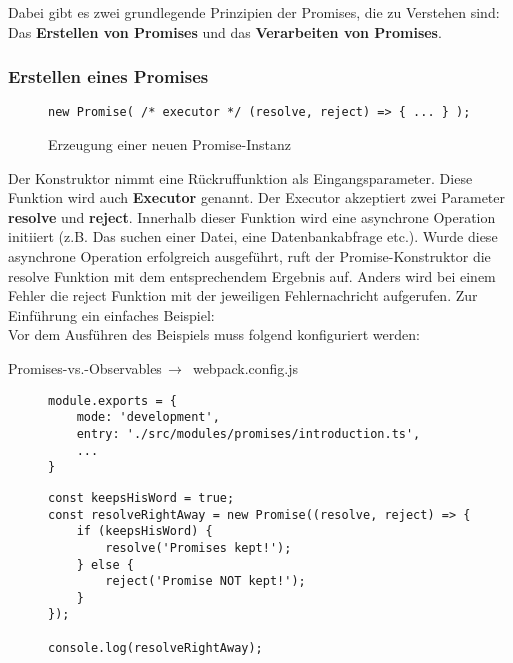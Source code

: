 \noindent
Dabei gibt es zwei grundlegende Prinzipien der Promises, die zu Verstehen sind: Das \textbf{Erstellen von Promises} und das \textbf{Verarbeiten von Promises}.

\subsubsection{Erstellen eines Promises}

\begin{figure}[H]
\begin{lstlisting}[basicstyle=\small]
new Promise( /* executor */ (resolve, reject) => { ... } );
\end{lstlisting}
\caption{Erzeugung einer neuen Promise-Instanz}
\end{figure}

Der Konstruktor nimmt eine Rückruffunktion als Eingangsparameter. Diese Funktion wird auch \textbf{Executor} genannt.\cite{promise-executor} Der Executor akzeptiert zwei Parameter \textbf{resolve} und \textbf{reject}. Innerhalb dieser Funktion wird eine asynchrone Operation initiiert (z.B. Das suchen einer Datei, eine Datenbankabfrage etc.). Wurde diese asynchrone Operation erfolgreich ausgeführt, ruft der Promise-Konstruktor die resolve Funktion mit dem entsprechendem Ergebnis auf. Anders wird bei einem Fehler die reject Funktion mit der jeweiligen Fehlernachricht aufgerufen. Zur Einführung ein einfaches Beispiel:\\

\noindent
Vor dem Ausführen des Beispiels muss folgend konfiguriert werden:

 \begin{center}
     Promises-vs.-Observables$\,\to\,$ webpack.config.js
 \end{center}

\begin{figure}[H]
\begin{lstlisting}[basicstyle=\small]
module.exports = {
    mode: 'development',
    entry: './src/modules/promises/introduction.ts',
    ...
}
\end{lstlisting}
\end{figure}

\begin{figure}[H]
\begin{lstlisting}[basicstyle=\small]
const keepsHisWord = true;
const resolveRightAway = new Promise((resolve, reject) => {
    if (keepsHisWord) {
        resolve('Promises kept!');
    } else {
        reject('Promise NOT kept!');
    }
});

console.log(resolveRightAway);
\end{lstlisting}
\end{figure}

